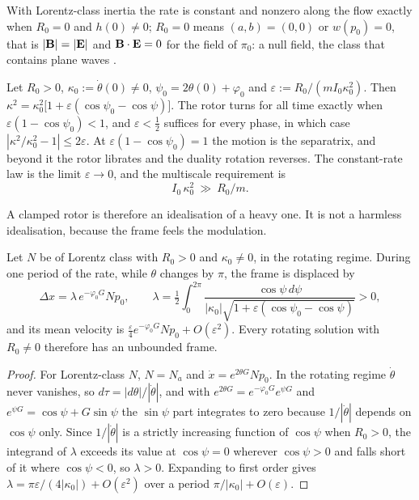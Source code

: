 \begin{corollary}
\label{cor:constrate}
With Lorentz-class inertia the rate is constant and nonzero along the flow exactly when $R_0=0$ and $h(0)\neq0$; $R_0=0$ means $(a,b)=(0,0)$ or
$w(p_0)=0$, that is $|\mathbf B|=|\mathbf E|$ and $\mathbf B\cdot\mathbf E=0$ for the field of $\pi_0$: a null field, the class that contains plane waves
\cite{Synge56,Robinson61}.
\end{corollary}

\begin{corollary}
\label{cor:multiscale}
Let $R_0>0$, $\kappa_0:=\dot\theta(0)\neq0$, $\psi_0=2\theta(0)+\varphi_0$ and $\varepsilon:=R_0/(mI_0\kappa_0^2)$. Then
$\kappa^2=\kappa_0^2\bigl[1+\varepsilon(\cos\psi_0-\cos\psi)\bigr]$. The rotor turns for all time exactly when $\varepsilon(1-\cos\psi_0)<1$, and $\varepsilon<\tfrac12$
suffices for every phase, in which case $|\kappa^2/\kappa_0^2-1|\le2\varepsilon$. At $\varepsilon(1-\cos\psi_0)=1$ the motion is the separatrix, and beyond it
the rotor librates and the duality rotation reverses. The constant-rate law is the limit $\varepsilon\to0$, and the multiscale requirement is
\begin{equation}
\label{eq:multiscale}
I_0\,\kappa_0^2\ \gg\ R_0/m .
\end{equation}
\end{corollary}

A clamped rotor is therefore an idealisation of a heavy one. It is not a harmless idealisation, because the frame feels the modulation.

\begin{theorem}
\label{thm:freedrift}
Let $N$ be of Lorentz class with $R_0>0$ and $\kappa_0\neq0$, in the rotating regime. During one period of the rate, while $\theta$ changes by $\pi$,
the frame is displaced by
\[
\Delta x=\lambda\,e^{-\varphi_0G}Np_0,\qquad \lambda=\tfrac12\int_0^{2\pi}\frac{\cos\psi\,d\psi}{|\kappa_0|\sqrt{1+\varepsilon(\cos\psi_0-\cos\psi)}}>0,
\]
and its mean velocity is $\tfrac\varepsilon4e^{-\varphi_0G}Np_0+O(\varepsilon^2)$. Every rotating solution with $R_0\neq0$ therefore has an unbounded frame.
\end{theorem}

\begin{proof}
For Lorentz-class $N$, $N=N_a$ and $\dot x=e^{2\theta G}Np_0$. In the rotating regime $\dot\theta$ never vanishes, so $d\tau=|d\theta|/|\dot\theta|$, and
with $e^{2\theta G}=e^{-\varphi_0G}e^{\psi G}$ and $e^{\psi G}=\cos\psi+G\sin\psi$ the $\sin\psi$ part integrates to zero because $1/|\dot\theta|$ depends on
$\cos\psi$ only. Since $1/|\dot\theta|$ is a strictly increasing function of $\cos\psi$ when $R_0>0$, the integrand of $\lambda$ exceeds its value at
$\cos\psi=0$ wherever $\cos\psi>0$ and falls short of it where $\cos\psi<0$, so $\lambda>0$. Expanding to first order gives
$\lambda=\pi\varepsilon/(4|\kappa_0|)+O(\varepsilon^2)$ over a period $\pi/|\kappa_0|+O(\varepsilon)$.
\end{proof}

